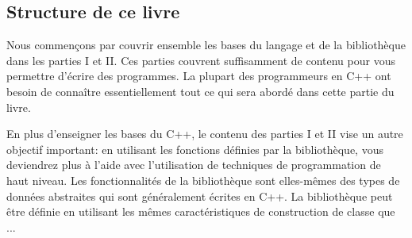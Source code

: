 \documentclass[a4paper,18pt,twoside]{report}
\begin{document}
\subsection{Structure de ce livre}
Nous commençons par couvrir ensemble les bases du langage et de la bibliothèque dans les parties I et II. Ces parties couvrent suffisamment de contenu pour vous permettre d'écrire des programmes. La plupart des programmeurs en C++ ont besoin de connaître essentiellement tout ce qui sera abordé dans cette partie du livre.

En plus d'enseigner les bases du C++, le contenu des parties I et II vise un autre objectif important: en utilisant les fonctions définies par la bibliothèque, vous deviendrez plus à l'aide avec l'utilisation de techniques de programmation de haut niveau. Les fonctionnalités de la bibliothèque sont elles-mêmes des types de données abstraites qui sont généralement écrites en C++. La bibliothèque peut être définie en utilisant les mêmes caractéristiques de construction de classe que ...



\end{document}
